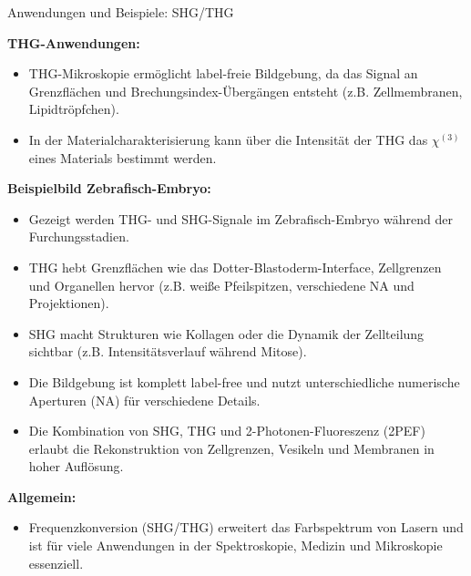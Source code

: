 \documentclass[notes=only]{beamer}
\begin{document}
\begin{frame}{Anwendungen und Beispiele: SHG/THG}
{\begin{itemize}
    \end{itemize}
    \textbf{THG-Anwendungen:}
    \begin{itemize}
      \item THG-Mikroskopie ermöglicht label-freie Bildgebung, da das Signal an Grenzflächen und Brechungsindex-Übergängen entsteht (z.B. Zellmembranen, Lipidtröpfchen).
      \item In der Materialcharakterisierung kann über die Intensität der THG das $\chi^{(3)}$ eines Materials bestimmt werden.
    \end{itemize}
    \textbf{Beispielbild Zebrafisch-Embryo:}
    \begin{itemize}
      \item Gezeigt werden THG- und SHG-Signale im Zebrafisch-Embryo während der Furchungsstadien.
      \item THG hebt Grenzflächen wie das Dotter-Blastoderm-Interface, Zellgrenzen und Organellen hervor (z.B. weiße Pfeilspitzen, verschiedene NA und Projektionen).
      \item SHG macht Strukturen wie Kollagen oder die Dynamik der Zellteilung sichtbar (z.B. Intensitätsverlauf während Mitose).
      \item Die Bildgebung ist komplett label-free und nutzt unterschiedliche numerische Aperturen (NA) für verschiedene Details.
      \item Die Kombination von SHG, THG und 2-Photonen-Fluoreszenz (2PEF) erlaubt die Rekonstruktion von Zellgrenzen, Vesikeln und Membranen in hoher Auflösung.
    \end{itemize}
    \textbf{Allgemein:}
    \begin{itemize}
      \item Frequenzkonversion (SHG/THG) erweitert das Farbspektrum von Lasern und ist für viele Anwendungen in der Spektroskopie, Medizin und Mikroskopie essenziell.
    \end{itemize}
  }
\end{frame}

\end{document}
